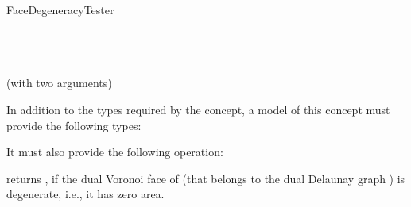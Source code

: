
\begin{ccRefFunctionObjectConcept}{FaceDegeneracyTester}

\ccRefines
{}\\
\\
\\
 (with two arguments)

\ccTypes

In addition to the types required by the 
concept, a model of this concept must provide the following types:

%
\ccThreeToTwo
{}
%
\ccGlue
{}






\ccOperations
It must also provide the following operation:

\ccThreeToTwo
{}
{returns , if the dual Voronoi face of  (that
  belongs to the dual Delaunay graph ) is
  degenerate, i.e., it has zero area.}
%


\end{ccRefFunctionObjectConcept}
